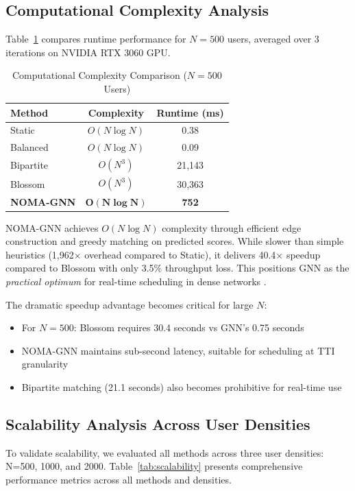 \documentclass[conference]{IEEEtran}
\begin{document}
\subsection{Computational Complexity Analysis}

Table~\ref{tab:complexity} compares runtime performance for $N=500$ users, averaged over 3 iterations on NVIDIA RTX 3060 GPU.

\begin{table}[h]
\centering
\caption{Computational Complexity Comparison ($N=500$ Users)}
\label{tab:complexity}
\begin{tabular}{l c c}
\toprule
\textbf{Method} & \textbf{Complexity} & \textbf{Runtime (ms)} \\
\midrule
Static & $O(N \log N)$ & 0.38 \\
Balanced & $O(N \log N)$ & 0.09 \\
Bipartite & $O(N^3)$ & 21,143 \\
Blossom & $O(N^3)$ & 30,363 \\
\textbf{NOMA-GNN} & $\boldsymbol{O(N \log N)}$ & \textbf{752} \\
\bottomrule
\end{tabular}
\end{table}

NOMA-GNN achieves $O(N \log N)$ complexity through efficient edge construction and greedy matching on predicted scores. While slower than simple heuristics  (1,962$\times$ overhead compared to Static), it delivers 40.4$\times$ speedup compared to Blossom  with only 3.5\% throughput loss. This positions GNN as the \emph{practical optimum} for real-time scheduling in dense networks .

The dramatic speedup advantage becomes critical for large $N$:
\begin{itemize}
    \item For $N=500$: Blossom requires 30.4 seconds vs GNN's 0.75 seconds
    \item NOMA-GNN maintains sub-second latency, suitable for scheduling at TTI granularity
    \item Bipartite matching (21.1 seconds) also becomes prohibitive for real-time use
\end{itemize}

\subsection{Scalability Analysis Across User Densities}

To validate scalability, we evaluated all methods across three user densities: N=500, 1000, and 2000. Table~\ref{tab:scalability} presents comprehensive performance metrics across all methods and densities.
\end{document}
